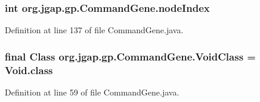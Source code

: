 \hypertarget{classorg_1_1jgap_1_1gp_1_1_command_gene_a6bb62473b76e1ada228260009a972dc2}{
\subsubsection[{node\-Index}]{\setlength{\rightskip}{0pt plus 5cm}int org.\-jgap.\-gp.\-Command\-Gene.\-node\-Index}}\label{classorg_1_1jgap_1_1gp_1_1_command_gene_a6bb62473b76e1ada228260009a972dc2}


Definition at line 137 of file Command\-Gene.\-java.

\hypertarget{classorg_1_1jgap_1_1gp_1_1_command_gene_a1214548cf4ac295646ccdf73259210d6}{
\subsubsection[{Void\-Class}]{\setlength{\rightskip}{0pt plus 5cm}final Class org.\-jgap.\-gp.\-Command\-Gene.\-Void\-Class = Void.\-class\hspace{0.3cm}{\ttfamily [static]}}}\label{classorg_1_1jgap_1_1gp_1_1_command_gene_a1214548cf4ac295646ccdf73259210d6}


Definition at line 59 of file Command\-Gene.\-java.




